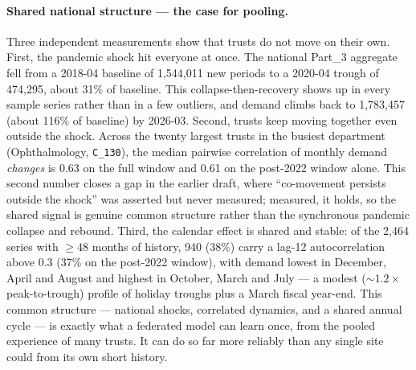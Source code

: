 \documentclass[11pt,a4paper]{article}
\begin{document}
\paragraph{Shared national structure --- the case for pooling.} Three independent measurements show that trusts do not move on their own. First, the pandemic shock hit everyone at once. The national Part\_3 aggregate fell from a 2018-04 baseline of 1,544,011 new periods to a 2020-04 trough of 474,295, about 31\% of baseline. This collapse-then-recovery shows up in every sample series rather than in a few outliers, and demand climbs back to 1,783,457 (about 116\% of baseline) by 2026-03. Second, trusts keep moving together even outside the shock. Across the twenty largest trusts in the busiest department (Ophthalmology, \texttt{C\_130}), the median pairwise correlation of monthly demand \emph{changes} is 0.63 on the full window and 0.61 on the post-2022 window alone. This second number closes a gap in the earlier draft, where ``co-movement persists outside the shock'' was asserted but never measured; measured, it holds, so the shared signal is genuine common structure rather than the synchronous pandemic collapse and rebound. Third, the calendar effect is shared and stable: of the 2{,}464 series with $\geq 48$ months of history, 940 (38\%) carry a lag-12 autocorrelation above 0.3 (37\% on the post-2022 window), with demand lowest in December, April and August and highest in October, March and July --- a modest ($\sim$$1.2\times$ peak-to-trough) profile of holiday troughs plus a March fiscal year-end. This common structure --- national shocks, correlated dynamics, and a shared annual cycle --- is exactly what a federated model can learn once, from the pooled experience of many trusts. It can do so far more reliably than any single site could from its own short history.
\end{document}
